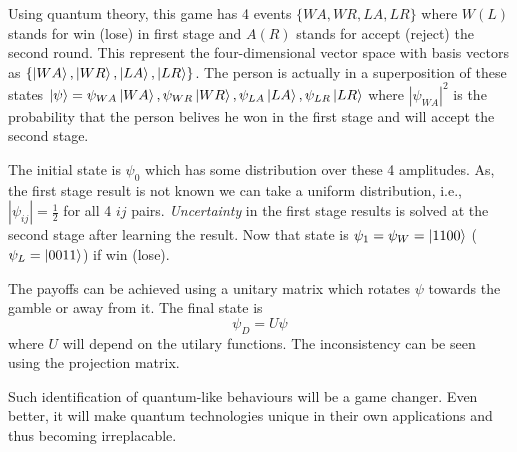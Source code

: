 Using quantum theory, this game has 4 events $\{WA, WR, LA, LR\}$ where $W (L)$ stands for win (lose) in first stage and $A (R)$ stands for accept (reject) the second round. This represent the four-dimensional vector space with basis vectors as $\{\ket{WA}, \ket{WR}, \ket{LA}, \ket{LR}\}$. The person is actually in a superposition of these states $|\psi\rangle = \psi_{WA}\ket{WA}, \psi_{WR}\ket{WR}, \psi_{LA}\ket{LA}, \psi_{LR}\ket{LR}$ where $|\psi_{WA}|^2$ is the probability that the person belives he won in the first stage and will accept the second stage.

The initial state is $\psi_0$ which has some distribution over these 4 amplitudes. As, the first stage result is not known we can take a uniform distribution, i.e., $|\psi_{ij}| = \frac{1}{2}$ for all 4 $ij$ pairs. \emph{Uncertainty} in the first stage results is solved at the second stage after learning the result. Now that state is $\psi_1 = \psi_W = \ket{1100}$ ($\psi_L = \ket{0011}$) if win (lose). 

The payoffs can be achieved using a unitary matrix which rotates $\psi$ towards the gamble or away from it. The final state is \[\psi_D = U\psi\]%
where $U$ will depend on the utilary functions. The  inconsistency can be seen using the projection matrix.

Such identification of quantum-like behaviours will be a game changer. Even better, it will make quantum technologies unique in their own applications and thus becoming irreplacable.